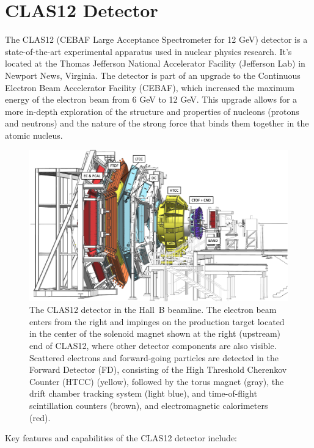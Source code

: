 \documentclass[a4paper,11pt]{article}
\begin{document}
\section{CLAS12 Detector}

The CLAS12 (CEBAF Large Acceptance Spectrometer for 12 GeV) detector is a state-of-the-art experimental apparatus used in nuclear physics research. It's located at the Thomas Jefferson National Accelerator Facility (Jefferson Lab) in Newport News, Virginia. The detector is part of an upgrade to the Continuous Electron Beam Accelerator Facility (CEBAF), which increased the maximum energy of the electron beam from 6 GeV to 12 GeV. This upgrade allows for a more in-depth exploration of the structure and properties of nucleons (protons and neutrons) and the nature of the strong force that binds them together in the atomic nucleus.


\begin{figure}[h!]
\centering
\centerline{\includegraphics[width=0.7\columnwidth]{images/CLAS12-side.png}}
\caption{The CLAS12 detector in the Hall~B beamline. The electron beam enters from the right and impinges on
  the production target located in the center of the solenoid magnet shown at the right (upstream) end of CLAS12,
  where other detector components are also visible. Scattered electrons and forward-going particles are detected
  in the Forward Detector (FD), consisting of the High Threshold Cherenkov Counter (HTCC) (yellow), 
  followed by the torus magnet (gray), the drift chamber tracking system (light blue),
  and time-of-flight scintillation counters (brown), and electromagnetic calorimeters (red). } 
\label{fig:CLAS12}
\end{figure}

Key features and capabilities of the CLAS12 detector include:
\end{document}
